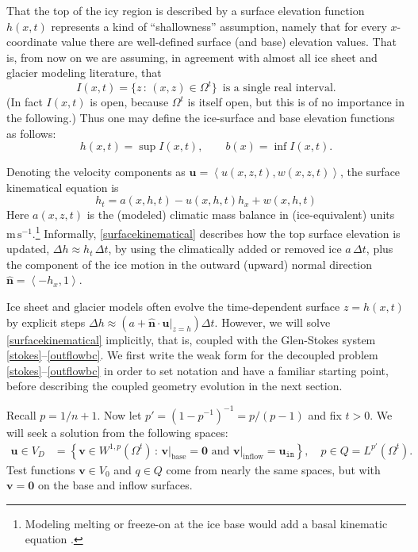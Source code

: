 \documentclass[letterpaper,final,12pt,reqno]{amsart}
\newcommand{\hbn}{\hat{\mathbf{n}}}
\newcommand{\bu}{\mathbf{u}}
\newcommand{\bv}{\mathbf{v}}
\newcommand{\bzero}{\bm{0}}
\begin{document}
That the top of the icy region is described by a surface elevation function $h(x,t)$ represents a kind of ``shallowness'' assumption, namely that for every $x$-coordinate value there are well-defined surface (and base) elevation values.  That is, from now on we are assuming, in agreement with almost all ice sheet and glacier modeling literature, that
\begin{equation}
I(x,t) = \{z\,:\,(x,z) \in \Omega^t\} \, \text{ is a single real interval}.\label{intervalassume}
\end{equation}
(In fact $I(x,t)$ is open, because $\Omega^t$ is itself open, but this is of no importance in the following.)  Thus one may define the ice-surface and base elevation functions as follows:
    $$h(x,t) = \sup I(x,t), \qquad b(x) = \inf I(x,t).$$

Denoting the velocity components as $\bu=\left<u(x,z,t),w(x,z,t)\right>$, the surface kinematical equation is
\begin{equation}
h_t = a(x,h,t) - u(x,h,t) h_x + w(x,h,t) \label{surfacekinematical}
\end{equation}
Here $a(x,z,t)$ is the (modeled) climatic mass balance in (ice-equivalent) units $\text{m}\,\text{s}^{-1}$.\footnote{Modeling melting or freeze-on at the ice base would add a basal kinematic equation \cite{Aschwandenetal2012}.}  Informally, \eqref{surfacekinematical} describes how the top surface elevation is updated, $\Delta h \approx h_t\,\Delta t$, by using the climatically added or removed ice $a\,\Delta t$, plus the component of the ice motion in the outward (upward) normal direction $\hbn = \left<-h_x,1\right>$.

Ice sheet and glacier models often evolve the time-dependent surface $z=h(x,t)$ by explicit steps $\Delta h \approx \left(a + \hbn\cdot \bu|_{z=h}\right) \Delta t$.  However, we will solve \eqref{surfacekinematical} implicitly, that is, coupled with the Glen-Stokes system \eqref{stokes}--\eqref{outflowbc}.  We first write the weak form for the decoupled problem \eqref{stokes}--\eqref{outflowbc} in order to set notation and have a familiar starting point, before describing the coupled geometry evolution in the next section.

Recall $p=1/n + 1$.  Now let $p'=(1-p^{-1})^{-1}=p/(p-1)$ and fix $t>0$.  We will seek a solution from the following spaces:
\begin{align*}
\bu \in V_D &= \left\{\bv \in W^{1,p}(\Omega^t)\,:\,\bv\big|_{\text{base}}=\bzero \text{ and } \bv\big|_{\text{inflow}} = \bu_{\texttt{in}}\right\}, \quad p \in Q =L^{p'}(\Omega^t).
\end{align*}
Test functions $\bv \in V_0$ and $q\in Q$ come from nearly the same spaces, but with $\bv=\bzero$ on the base and inflow surfaces.
\end{document}
